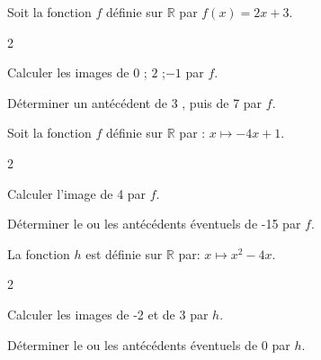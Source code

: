 \documentclass[11pt,a4paper]{article}  %
\begin{document}
	\graphicspath{{images/}}
	
	\begin{center}
		
		
	\end{center}



Soit la fonction $f$ définie sur $\mathbb{R}$ par $f(x)=2 x+3$.
\begin{multicols}{2}
	\begin{enumMet}
	\item Calculer les images de $0$ ; $2$ ;$-1$ par $f$.
	\item Déterminer un antécédent de 3 , puis de 7 par $f$.
\end{enumMet}
\end{multicols}


Soit la fonction $f$ définie sur $\mathbb{R}$ par : $x \mapsto-4x+1$.
\begin{multicols}{2}
	\begin{enumMet}
	\item Calculer l'image de 4 par $f$.
	\item Déterminer le ou les antécédents éventuels de -15 par $f$.
\end{enumMet}
\end{multicols}


La fonction $h$ est définie sur $\mathbb{R}$ par: $x \mapsto x^2-4 x$.
\begin{multicols}{2}
	\begin{enumMet}
	\item Calculer les images de -2 et de 3 par $h$.
	\item Déterminer le ou les antécédents éventuels de 0 par $h$.
\end{enumMet}
\end{multicols}
\end{document}
